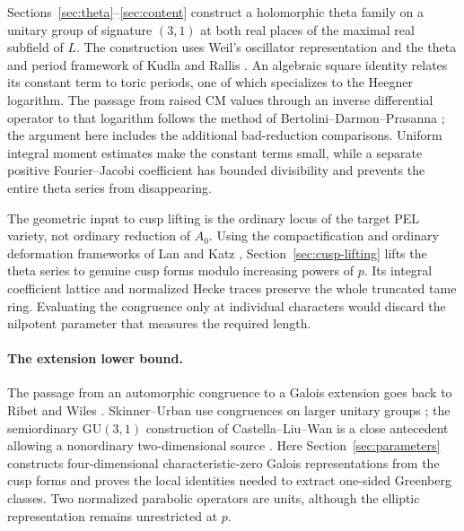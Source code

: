 Sections~\ref{sec:theta}--\ref{sec:content} construct a holomorphic
theta family on a unitary group of signature $(3,1)$ at both real
places of the maximal real subfield of $L$. The construction uses
Weil's oscillator representation and the theta and period framework
of Kudla and Rallis \citep{Weil1964,Kudla1994,Rallis1984Injectivity}.
An algebraic square identity relates its constant term to toric
periods, one of which specializes to the Heegner logarithm. The
passage from raised CM values through an inverse differential
operator to that logarithm follows the method of
Bertolini--Darmon--Prasanna \citep{BertoliniDarmonPrasanna2013}; the
argument here includes the additional bad-reduction comparisons.
Uniform integral moment estimates make the constant terms small,
while a separate positive Fourier--Jacobi coefficient has bounded
divisibility and prevents the entire theta series from disappearing.

The geometric input to cusp lifting is the ordinary locus of the
target PEL variety, not ordinary reduction of $A_0$.
Using the compactification and ordinary deformation frameworks of
Lan and Katz \citep{Lan2013,Lan2018Ordinary,Katz1981SerreTate},
Section~\ref{sec:cusp-lifting} lifts the theta series to genuine
cusp forms modulo increasing powers of $p$. Its integral coefficient
lattice and normalized Hecke traces preserve the whole truncated
tame ring. Evaluating the congruence only at individual characters
would discard the nilpotent parameter that measures the required
length.

\paragraph{The extension lower bound.}
The passage from an automorphic congruence to a Galois extension
goes back to Ribet and Wiles \citep{Ribet1976,Wiles1990}.
Skinner--Urban use congruences on larger unitary groups
\citep{SkinnerUrban2014}; the semiordinary $\mathrm{GU}(3,1)$
construction of Castella--Liu--Wan is a close antecedent allowing a
nonordinary two-dimensional source
\citep{CastellaLiuWan2022,CastellaLiuWanAddendum}.
Here Section~\ref{sec:parameters} constructs four-dimensional
characteristic-zero Galois representations from the cusp forms and
proves the local identities needed to extract one-sided Greenberg
classes. Two normalized parabolic operators are units, although
the elliptic representation remains unrestricted at $p$.

